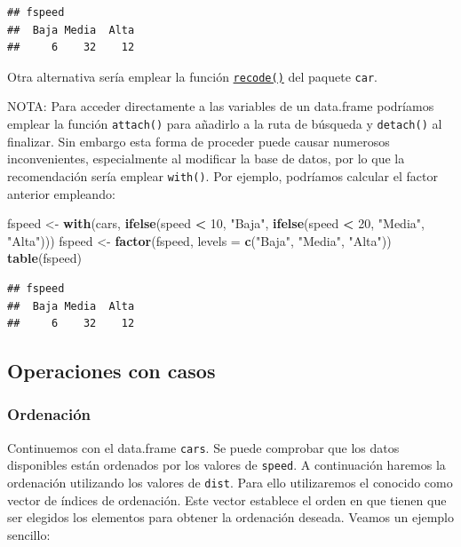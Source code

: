 \documentclass[
]{book}
\newenvironment{Shaded}{\begin{snugshade}}{\end{snugshade}}
\newcommand{\AttributeTok}[1]{\textcolor[rgb]{0.13,0.29,0.53}{#1}}
\newcommand{\DecValTok}[1]{\textcolor[rgb]{0.00,0.00,0.81}{#1}}
\newcommand{\FunctionTok}[1]{\textcolor[rgb]{0.13,0.29,0.53}{\textbf{#1}}}
\newcommand{\NormalTok}[1]{#1}
\newcommand{\OtherTok}[1]{\textcolor[rgb]{0.56,0.35,0.01}{#1}}
\newcommand{\SpecialCharTok}[1]{\textcolor[rgb]{0.81,0.36,0.00}{\textbf{#1}}}
\newcommand{\StringTok}[1]{\textcolor[rgb]{0.31,0.60,0.02}{#1}}
\begin{document}
\begin{verbatim}
## fspeed
##  Baja Media  Alta 
##     6    32    12
\end{verbatim}

Otra alternativa sería emplear la función \href{https://www.rdocumentation.org/packages/car/versions/3.0-9/topics/recode}{\texttt{recode()}} del paquete \texttt{car}.

NOTA: Para acceder directamente a las variables de un data.frame podríamos emplear la función \texttt{attach()} para añadirlo a la ruta de búsqueda y \texttt{detach()} al finalizar.
Sin embargo esta forma de proceder puede causar numerosos inconvenientes, especialmente al modificar la base de datos, por lo que la recomendación sería emplear \texttt{with()}.
Por ejemplo, podríamos calcular el factor anterior empleando:

\begin{Shaded}
\begin{Highlighting}[]
\NormalTok{fspeed }\OtherTok{\textless{}{-}} \FunctionTok{with}\NormalTok{(cars, }\FunctionTok{ifelse}\NormalTok{(speed }\SpecialCharTok{\textless{}} \DecValTok{10}\NormalTok{, }\StringTok{"Baja"}\NormalTok{,}
                 \FunctionTok{ifelse}\NormalTok{(speed }\SpecialCharTok{\textless{}} \DecValTok{20}\NormalTok{, }\StringTok{"Media"}\NormalTok{, }\StringTok{"Alta"}\NormalTok{)))}
\NormalTok{fspeed }\OtherTok{\textless{}{-}} \FunctionTok{factor}\NormalTok{(fspeed, }\AttributeTok{levels =} \FunctionTok{c}\NormalTok{(}\StringTok{"Baja"}\NormalTok{, }\StringTok{"Media"}\NormalTok{, }\StringTok{"Alta"}\NormalTok{))}
\FunctionTok{table}\NormalTok{(fspeed)}
\end{Highlighting}
\end{Shaded}

\begin{verbatim}
## fspeed
##  Baja Media  Alta 
##     6    32    12
\end{verbatim}

\subsection{Operaciones con casos}\label{operaciones-con-casos}

\subsubsection{Ordenación}\label{ordenaciuxf3n}

Continuemos con el data.frame \texttt{cars}.
Se puede comprobar que los datos disponibles están ordenados por
los valores de \texttt{speed}. A continuación haremos la ordenación utilizando
los valores de \texttt{dist}. Para ello utilizaremos el conocido como vector de
índices de ordenación.
Este vector establece el orden en que tienen que ser elegidos los
elementos para obtener la ordenación deseada.
Veamos un ejemplo sencillo:
\end{document}
